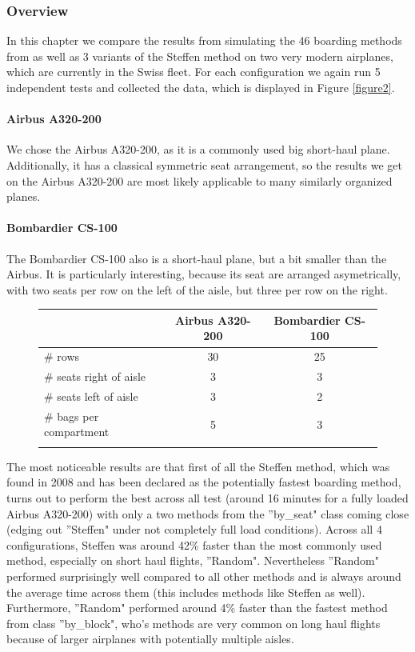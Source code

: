 \documentclass[11pt]{article}
\begin{document}
 
 \subsubsection{Overview}
 In this chapter we compare the results from simulating the 46 boarding methods from \cite{beus} as well as 3 variants of the Steffen method \cite{steffen} on two very modern airplanes, which are currently in the Swiss fleet. For each configuration we again run 5 independent tests and collected the data, which is displayed in Figure \ref{figure2}. 
 
 
 \paragraph{Airbus A320-200}
 We chose the Airbus A320-200, as it is a commonly used big short-haul plane. Additionally, it has a classical symmetric seat arrangement, so the results we get on the Airbus A320-200 are most likely applicable to many similarly organized planes. 


 \paragraph{Bombardier CS-100}
 The Bombardier CS-100 also is a short-haul plane, but a bit smaller than the Airbus. It is particularly interesting, because its seat are arranged asymetrically, with two seats per row on the left of the aisle, but three per row on the right.  
\begin{figure}[h!]
	\center
 \begin{tabular}{l|c c }

	 \hline
	&Airbus A320-200 &Bombardier CS-100 \\
	\hline
\# rows & 30&25   \\
\hline
\# seats right of aisle & 3 & 3 \\
	\hline
	\# seats left of aisle & 3 & 2\\
	\hline
	\# bags per compartment & 5 & 3\\
	\hline
	\\
\end{tabular}
\end{figure}

 The most noticeable results are that first of all the Steffen method, which was found in 2008 and has been declared as the potentially fastest boarding method, turns out to perform the best across all test (around 16 minutes for a fully loaded Airbus A320-200) with only a two methods from the ''by\_seat" class coming close (edging out ''Steffen" under not completely full load conditions). Across all 4 configurations, Steffen was around 42\% faster than the most commonly used method, especially on short haul flights, ''Random". Nevertheless ''Random" performed surprisingly well compared to all other methods and is always around the average time across them (this includes methods like Steffen as well). Furthermore, ''Random" performed around 4\% faster than the fastest method from class ''by\_block", who's methods are very common on long haul flights because of larger airplanes with potentially multiple aisles.
 
\end{document}
